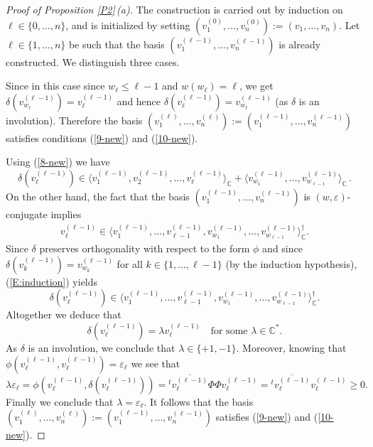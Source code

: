 \documentclass{amsart}
\theoremstyle{definition}
\begin{document}
\begin{proof}[Proof of Proposition \ref{P2}\,{\rm (a)}]
The construction is carried out by induction on $\ell\in\{0,\ldots,n\}$, and
 is initialized by setting
$(v_1^{(0)},\ldots,v_n^{(0)}):=(v_1,\ldots,v_n)$. Let
$\ell\in\{1,\ldots,n\}$ be such that the basis
$(v_1^{(\ell-1)},\ldots,v_n^{(\ell-1)})$ is already constructed. We
distinguish three cases.

\medskip
{}

Since in this case since $w_\ell\leq\ell-1$ and $w(w_\ell)=\ell$, we get
$\delta(v_{w_\ell}^{(\ell-1)})=v_{\ell}^{(\ell-1)}$ and hence
$\delta(v_{\ell}^{(\ell-1)})=v_{w_\ell}^{(\ell-1)}$ (as
$\delta$ is an involution). Therefore the basis
$(v_1^{(\ell)},\ldots,v_n^{(\ell)}):=(v_1^{(\ell-1)},\ldots,v_n^{(\ell-1)})$
satisfies conditions (\ref{9-new}) and (\ref{10-new}).

\medskip
{}

Using (\ref{8-new}) we have
\[\delta(v_\ell^{(\ell-1)})\in\langle v_1^{(\ell-1)},v_2^{(\ell-1)},\ldots,v_\ell^{(\ell-1)}\rangle_\mathbb{C}+\langle v_{w_1}^{(\ell-1)},\ldots,v_{w_{\ell-1}}^{(\ell-1)}\rangle_\mathbb{C}\,.\]
On the other hand, the fact that the basis
$(v_1^{(\ell-1)},\ldots,v_n^{(\ell-1)})$ is
$(w,\varepsilon)$-conjugate implies
\begin{align}v_\ell^{(\ell-1)}\in\langle v_1^{(\ell-1)},\ldots,v_{\ell-1}^{(\ell-1)},v_{w_1}^{(\ell-1)},\ldots,v_{w_{\ell-1}}^{(\ell-1)}\rangle_\mathbb{C}^\dag.
\label{E:induction}
\end{align}
Since $\delta$ preserves orthogonality with respect to the form
$\phi$ and since $\delta(v_k^{(\ell-1)})=v_{w_k}^{(\ell-1)}$
for all $k\in\{1,\ldots,\ell-1\}$ (by the induction hypothesis), (\ref{E:induction}) yields
\[\delta(v_\ell^{(\ell-1)})\in\langle v_1^{(\ell-1)},\ldots,v_{\ell-1}^{(\ell-1)},v_{w_1}^{(\ell-1)},\ldots,v_{w_{\ell-1}}^{(\ell-1)}\rangle_\mathbb{C}^\dag.\]
Altogether we deduce that
\[\delta(v_\ell^{(\ell-1)})=\lambda
v_\ell^{(\ell-1)}\quad\mbox{for some $\lambda\in\mathbb{C}^*$.}\] 
As $\delta$ is an involution, we conclude that $\lambda\in\{+1,-1\}$.
Moreover, knowing that
$\phi(v_\ell^{(\ell-1)},v_\ell^{(\ell-1)})=\varepsilon_\ell$ we see
that
\[\lambda\varepsilon_\ell=\phi(v_\ell^{(\ell-1)},\delta(v_\ell^{(\ell-1)}))={}^t\overline{v_\ell^{(\ell-1)}}\Phi\Phi v_\ell^{(\ell-1)}={}^t\overline{v_\ell^{(\ell-1)}}v_\ell^{(\ell-1)}\geq 0.\]
Finally we conclude that $\lambda=\varepsilon_\ell$. It follows that
the basis
$(v_1^{(\ell)},\ldots,v_n^{(\ell)}):=(v_1^{(\ell-1)},\ldots,v_n^{(\ell-1)})$
satisfies (\ref{9-new}) and (\ref{10-new}).


\end{proof}
\end{document}
